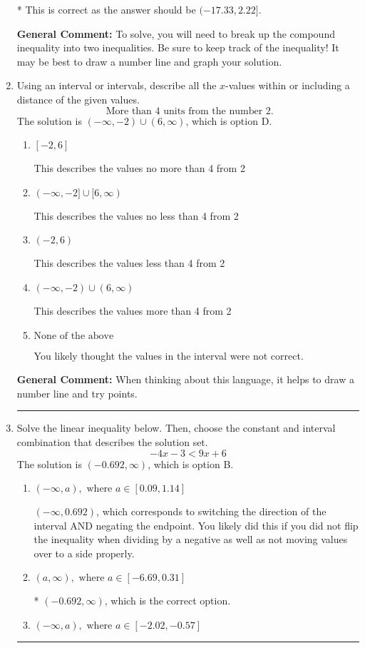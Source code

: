 \documentclass{extbook}[14pt]
\newcommand{\litem}[1]{\item #1

\rule{\textwidth}{0.4pt}}
\begin{document}
\begin{enumerate}
{\begin{enumerate}[label=\Alph*.]
* This is correct as the answer should be $(-17.33, 2.22]$.
\end{enumerate}

\textbf{General Comment:} To solve, you will need to break up the compound inequality into two inequalities. Be sure to keep track of the inequality! It may be best to draw a number line and graph your solution.
}
\litem{
Using an interval or intervals, describe all the $x$-values within or including a distance of the given values.
\[ \text{ More than } 4 \text{ units from the number } 2. \]The solution is \( (-\infty, -2) \cup (6, \infty) \), which is option D.\begin{enumerate}[label=\Alph*.]
\item \( [-2, 6] \)

This describes the values no more than 4 from 2
\item \( (-\infty, -2] \cup [6, \infty) \)

This describes the values no less than 4 from 2
\item \( (-2, 6) \)

This describes the values less than 4 from 2
\item \( (-\infty, -2) \cup (6, \infty) \)

This describes the values more than 4 from 2
\item \( \text{None of the above} \)

You likely thought the values in the interval were not correct.
\end{enumerate}

\textbf{General Comment:} When thinking about this language, it helps to draw a number line and try points.
}
\litem{
Solve the linear inequality below. Then, choose the constant and interval combination that describes the solution set.
\[ -4x -3 < 9x + 6 \]The solution is \( (-0.692, \infty) \), which is option B.\begin{enumerate}[label=\Alph*.]
\item \( (-\infty, a), \text{ where } a \in [0.09, 1.14] \)

 $(-\infty, 0.692)$, which corresponds to switching the direction of the interval AND negating the endpoint. You likely did this if you did not flip the inequality when dividing by a negative as well as not moving values over to a side properly.
\item \( (a, \infty), \text{ where } a \in [-6.69, 0.31] \)

* $(-0.692, \infty)$, which is the correct option.
\item \( (-\infty, a), \text{ where } a \in [-2.02, -0.57] \)


\end{enumerate}}
\end{enumerate}
\end{document}
